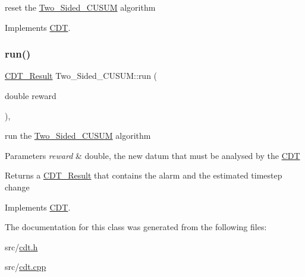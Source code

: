 reset the \mbox{\hyperlink{class_two___sided___c_u_s_u_m}{Two\+\_\+\+Sided\+\_\+\+C\+U\+S\+UM}} algorithm 



Implements \mbox{\hyperlink{class_c_d_t_a46446ec219a819466ff418d9ab7aa728}{C\+DT}}.

\mbox{\label{class_two___sided___c_u_s_u_m_a6b6bb55a881148cb4e969b0fbf186315}} 
\subsubsection{\texorpdfstring{run()}{run()}}
{\footnotesize\ttfamily \mbox{\hyperlink{class_c_d_t___result}{C\+D\+T\+\_\+\+Result}} Two\+\_\+\+Sided\+\_\+\+C\+U\+S\+U\+M\+::run (\begin{DoxyParamCaption}\item[{double}]{reward }\end{DoxyParamCaption})\hspace{0.3cm}{\ttfamily [override]}, {\ttfamily [virtual]}}



run the \mbox{\hyperlink{class_two___sided___c_u_s_u_m}{Two\+\_\+\+Sided\+\_\+\+C\+U\+S\+UM}} algorithm 


\begin{DoxyParams}{Parameters}
{\em reward} & double, the new datum that must be analysed by the \mbox{\hyperlink{class_c_d_t}{C\+DT}} \\
\hline
\end{DoxyParams}
\begin{DoxyReturn}{Returns}
a \mbox{\hyperlink{class_c_d_t___result}{C\+D\+T\+\_\+\+Result}} that contains the alarm and the estimated timestep change 
\end{DoxyReturn}


Implements \mbox{\hyperlink{class_c_d_t_a2493aeb166403f448ec689d2f7b85dbc}{C\+DT}}.



The documentation for this class was generated from the following files\+:\begin{DoxyCompactItemize}
\item 
src/\mbox{\hyperlink{cdt_8h}{cdt.\+h}}\item 
src/\mbox{\hyperlink{cdt_8cpp}{cdt.\+cpp}}\end{DoxyCompactItemize}
